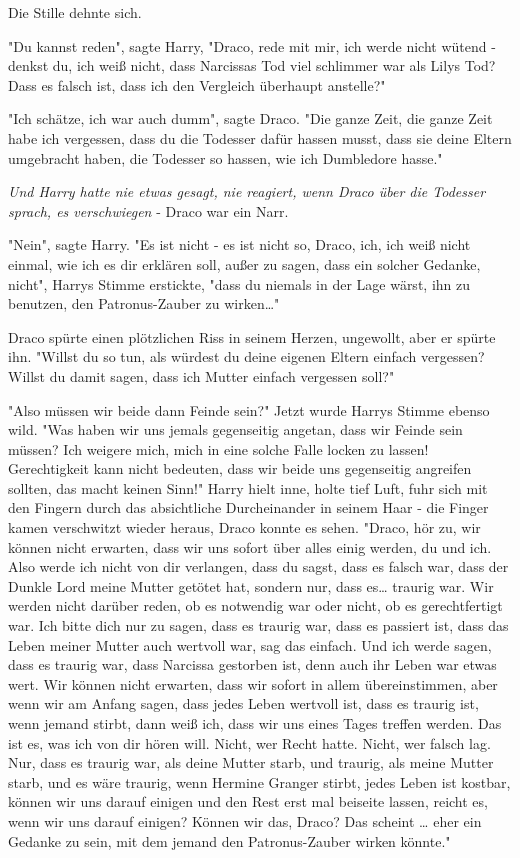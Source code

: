 {Die Stille dehnte sich.

"Du kannst reden", sagte Harry, "Draco, rede mit mir, ich werde nicht wütend - denkst du, ich weiß nicht, dass Narcissas Tod viel schlimmer war als Lilys Tod? Dass es falsch ist, dass ich den Vergleich überhaupt anstelle?"

"Ich schätze, ich war auch dumm", sagte Draco. "Die ganze Zeit, die ganze Zeit habe ich vergessen, dass du die Todesser dafür hassen musst, dass sie deine Eltern umgebracht haben, die Todesser so hassen, wie ich Dumbledore hasse."

\emph{Und Harry hatte nie etwas gesagt, nie reagiert, wenn Draco über die Todesser sprach, es verschwiegen} - Draco war ein Narr.

"Nein", sagte Harry. "Es ist nicht - es ist nicht so, Draco, ich, ich weiß nicht einmal, wie ich es dir erklären soll, außer zu sagen, dass ein solcher Gedanke, nicht", Harrys Stimme erstickte, "dass du niemals in der Lage wärst, ihn zu benutzen, den Patronus-Zauber zu wirken…"

Draco spürte einen plötzlichen Riss in seinem Herzen, ungewollt, aber er spürte ihn. "Willst du so tun, als würdest du deine eigenen Eltern einfach vergessen? Willst du damit sagen, dass ich Mutter einfach vergessen soll?"

"Also müssen wir beide dann Feinde sein?" Jetzt wurde Harrys Stimme ebenso wild. "Was haben wir uns jemals gegenseitig angetan, dass wir Feinde sein müssen? Ich weigere mich, mich in eine solche Falle locken zu lassen! Gerechtigkeit kann nicht bedeuten, dass wir beide uns gegenseitig angreifen sollten, das macht keinen Sinn!" Harry hielt inne, holte tief Luft, fuhr sich mit den Fingern durch das absichtliche Durcheinander in seinem Haar - die Finger kamen verschwitzt wieder heraus, Draco konnte es sehen. "Draco, hör zu, wir können nicht erwarten, dass wir uns sofort über alles einig werden, du und ich. Also werde ich nicht von dir verlangen, dass du sagst, dass es falsch war, dass der Dunkle Lord meine Mutter getötet hat, sondern nur, dass es… traurig war. Wir werden nicht darüber reden, ob es notwendig war oder nicht, ob es gerechtfertigt war. Ich bitte dich nur zu sagen, dass es traurig war, dass es passiert ist, dass das Leben meiner Mutter auch wertvoll war, sag das einfach. Und ich werde sagen, dass es traurig war, dass Narcissa gestorben ist, denn auch ihr Leben war etwas wert. Wir können nicht erwarten, dass wir sofort in allem übereinstimmen, aber wenn wir am Anfang sagen, dass jedes Leben wertvoll ist, dass es traurig ist, wenn jemand stirbt, dann weiß ich, dass wir uns eines Tages treffen werden. Das ist es, was ich von dir hören will. Nicht, wer Recht hatte. Nicht, wer falsch lag. Nur, dass es traurig war, als deine Mutter starb, und traurig, als meine Mutter starb, und es wäre traurig, wenn Hermine Granger stirbt, jedes Leben ist kostbar, können wir uns darauf einigen und den Rest erst mal beiseite lassen, reicht es, wenn wir uns darauf einigen? Können wir das, Draco? Das scheint … eher ein Gedanke zu sein, mit dem jemand den Patronus-Zauber wirken könnte."

}
